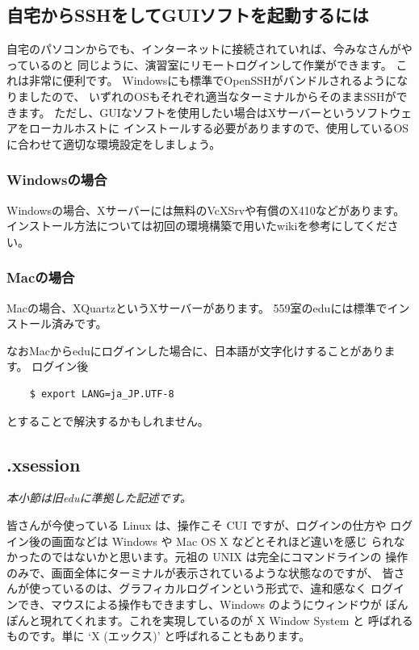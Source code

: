 \documentclass[a4j]{ltjsreport}
\begin{document}
    \vspace{1em}

    \subsection{自宅からSSHをしてGUIソフトを起動するには}
    自宅のパソコンからでも、インターネットに接続されていれば、今みなさんがやっているのと
    同じように、演習室にリモートログインして作業ができます。
    これは非常に便利です。
    Windowsにも標準でOpenSSHがバンドルされるようになりましたので、
    いずれのOSもそれぞれ適当なターミナルからそのままSSHができます。
    ただし、GUIなソフトを使用したい場合はXサーバーというソフトウェアをローカルホストに
    インストールする必要がありますので、使用しているOSに合わせて適切な環境設定をしましょう。

    \subsubsection{Windowsの場合}
    Windowsの場合、Xサーバーには無料のVcXSrvや有償のX410などがあります。
    インストール方法については初回の環境構築で用いたwikiを参考にしてください。

    \subsubsection{Macの場合}
    Macの場合、XQuartzというXサーバーがあります。
    559室のeduには標準でインストール済みです。

    なおMacからeduにログインした場合に、日本語が文字化けすることがあります。
    ログイン後
    \begin{verbatim}
    $ export LANG=ja_JP.UTF-8
    \end{verbatim}
    とすることで解決するかもしれません。

    \subsection{.xsession}
    \emph{本小節は旧eduに準拠した記述です。}

    皆さんが今使っている Linux は、操作こそ CUI ですが、ログインの仕方や
    ログイン後の画面などは Windows や Mac OS X などとそれほど違いを感じ
    られなかったのではないかと思います。元祖の UNIX は完全にコマンドラインの
    操作のみで、画面全体にターミナルが表示されているような状態なのですが、
    皆さんが使っているのは、グラフィカルログインという形式で、違和感なく
    ログインでき、マウスによる操作もできますし、Windows のようにウィンドウが
    ぽんぽんと現れてくれます。これを実現しているのが X Window System と
    呼ばれるものです。単に `X (エックス)' と呼ばれることもあります。
\end{document}
